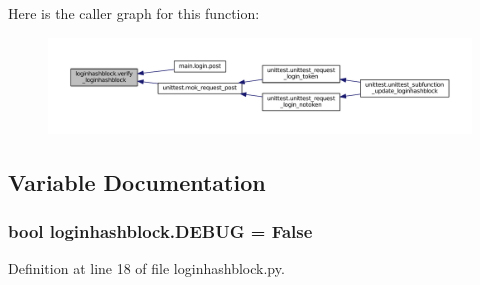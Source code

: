Here is the caller graph for this function\+:\nopagebreak
\begin{figure}[H]
\begin{center}
\leavevmode
\includegraphics[width=350pt]{namespaceloginhashblock_aa5bb94484a68d0bbebce23b4cfeeb4b7_icgraph}
\end{center}
\end{figure}




\subsection{Variable Documentation}
\subsubsection[{\texorpdfstring{D\+E\+B\+UG}{DEBUG}}]{\setlength{\rightskip}{0pt plus 5cm}bool loginhashblock.\+D\+E\+B\+UG = False}\hypertarget{namespaceloginhashblock_ad198a2ffc3d7bab32167aed00d2f5c65}{}\label{namespaceloginhashblock_ad198a2ffc3d7bab32167aed00d2f5c65}


Definition at line 18 of file loginhashblock.\+py.

